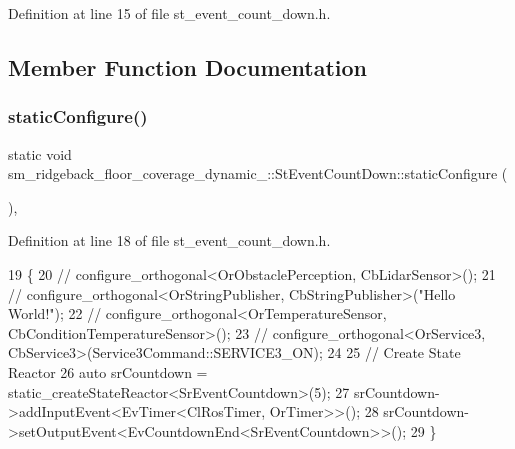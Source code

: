 Definition at line 15 of file st\+\_\+event\+\_\+count\+\_\+down.\+h.



\subsection{Member Function Documentation}
\mbox{\label{structsm__ridgeback__floor__coverage__dynamic__1_1_1StEventCountDown_aacf7e164a0dfb240918ff737fd61570d}} 
\subsubsection{\texorpdfstring{static\+Configure()}{staticConfigure()}}
{\footnotesize\ttfamily static void sm\+\_\+ridgeback\+\_\+floor\+\_\+coverage\+\_\+dynamic\+\_\+::\+St\+Event\+Count\+Down\+::static\+Configure (\begin{DoxyParamCaption}{ }\end{DoxyParamCaption})\hspace{0.3cm}{\ttfamily [inline]}, {\ttfamily [static]}}



Definition at line 18 of file st\+\_\+event\+\_\+count\+\_\+down.\+h.


\begin{DoxyCode}
19     \{
20         \textcolor{comment}{//   configure\_orthogonal<OrObstaclePerception, CbLidarSensor>();}
21         \textcolor{comment}{//   configure\_orthogonal<OrStringPublisher, CbStringPublisher>("Hello World!");}
22         \textcolor{comment}{//   configure\_orthogonal<OrTemperatureSensor, CbConditionTemperatureSensor>();}
23         \textcolor{comment}{//   configure\_orthogonal<OrService3, CbService3>(Service3Command::SERVICE3\_ON);        }
24         
25         \textcolor{comment}{// Create State Reactor}
26         \textcolor{keyword}{auto} srCountdown = static\_createStateReactor<SrEventCountdown>(5);        
27         srCountdown->addInputEvent<EvTimer<ClRosTimer, OrTimer>>();
28         srCountdown->setOutputEvent<EvCountdownEnd<SrEventCountdown>>();
29     \}
\end{DoxyCode}


